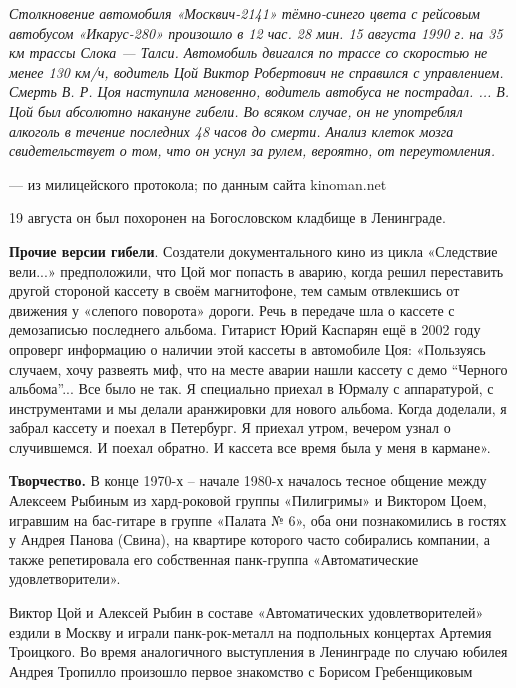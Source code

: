 {\it Столкновение автомобиля «Москвич-2141» тёмно-синего цвета с рейсовым автобусом «Икарус-280» произошло в 12 час. 28 мин. 15 августа 1990 г. на 35 км трассы Слока --- Талси. Автомобиль двигался по трассе со скоростью не менее 130 км/ч, водитель Цой Виктор Робертович не справился с управлением. Смерть В. Р. Цоя наступила мгновенно, водитель автобуса не пострадал. ... В. Цой был абсолютно  накануне гибели. Во всяком случае, он не употреблял алкоголь в течение последних 48 часов до смерти. Анализ клеток мозга свидетельствует о том, что он уснул за рулем, вероятно, от переутомления.

        --- из милицейского протокола; по данным сайта kinoman.net}

19 августа он был похоронен на Богословском кладбище в Ленинграде.

\textbf{Прочие версии гибели}.
Создатели документального кино из цикла «Следствие вели...» предположили, что Цой мог попасть в аварию, когда решил переставить другой стороной кассету в своём магнитофоне, тем самым отвлекшись от движения у «слепого поворота» дороги. Речь в передаче шла о кассете с демозаписью последнего альбома. Гитарист Юрий Каспарян ещё в 2002 году опроверг информацию о наличии этой кассеты в автомобиле Цоя: «Пользуясь случаем, хочу развеять миф, что на месте аварии нашли кассету с демо ``Черного альбома''... Все было не так. Я специально приехал в Юрмалу с аппаратурой, с инструментами и мы делали аранжировки для нового альбома. Когда доделали, я забрал кассету и поехал в Петербург. Я приехал утром, вечером узнал о случившемся. И поехал обратно. И кассета все время была у меня в кармане».


\textbf{Творчество.}
В конце 1970-х -- начале 1980-х началось тесное общение между Алексеем Рыбиным из хард-роковой группы «Пилигримы» и Виктором Цоем, игравшим на бас-гитаре в группе «Палата № 6», оба они познакомились в гостях у Андрея Панова (Свина), на квартире которого часто собирались компании, а также репетировала его собственная панк-группа «Автоматические удовлетворители».

Виктор Цой и Алексей Рыбин в составе «Автоматических удовлетворителей» ездили в Москву и играли панк-рок-металл на подпольных концертах Артемия Троицкого. Во время аналогичного выступления в Ленинграде по случаю юбилея Андрея Тропилло произошло первое знакомство с Борисом Гребенщиковым

